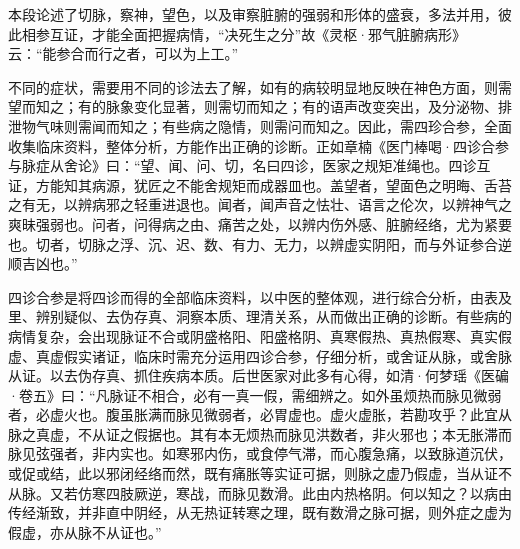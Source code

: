 \documentclass[12pt]{ctexbook}
\begin{document}


本段论述了切脉，察神，望色，以及审察脏腑的强弱和形体的盛衰，多法并用，彼此相参互证，才能全面把握病情，“决死生之分”故《灵枢·邪气脏腑病形》云：“能参合而行之者，可以为上工。”

不同的症状，需要用不同的诊法去了解，如有的病较明显地反映在神色方面，则需望而知之；有的脉象变化显著，则需切而知之；有的语声改变突出，及分泌物、排泄物气味则需闻而知之；有些病之隐情，则需问而知之。因此，需四珍合参，全面收集临床资料，整体分析，方能作出正确的诊断。正如章楠《医门棒喝·四诊合参与脉症从舍论》曰：“望、闻、问、切，名曰四诊，医家之规矩准绳也。四诊互证，方能知其病源，犹匠之不能舍规矩而成器皿也。盖望者，望面色之明晦、舌苔之有无，以辨病邪之轻重进退也。闻者，闻声音之怯壮、语言之伦次，以辨神气之爽昧强弱也。问者，问得病之由、痛苦之处，以辨内伤外感、脏腑经络，尤为紧要也。切者，切脉之浮、沉、迟、数、有力、无力，以辨虚实阴阳，而与外证参合逆顺吉凶也。”



四诊合参是将四诊而得的全部临床资料，以中医的整体观，进行综合分析，由表及里、辨别疑似、去伪存真、洞察本质、理清关系，从而做出正确的诊断。有些病的病情复杂，会出现脉证不合或阴盛格阳、阳盛格阴、真寒假热、真热假寒、真实假虚、真虚假实诸证，临床时需充分运用四诊合参，仔细分析，或舍证从脉，或舍脉从证。以去伪存真、抓住疾病本质。后世医家对此多有心得，如清·何梦瑶《医碥·卷五》曰：“凡脉证不相合，必有一真一假，需细辨之。如外虽烦热而脉见微弱者，必虚火也。腹虽胀满而脉见微弱者，必胃虚也。虚火虚胀，若勘攻乎？此宜从脉之真虚，不从证之假据也。其有本无烦热而脉见洪数者，非火邪也；本无胀滞而脉见弦强者，非内实也。如寒邪内伤，或食停气滞，而心腹急痛，以致脉道沉伏，或促或结，此以邪闭经络而然，既有痛胀等实证可据，则脉之虚乃假虚，当从证不从脉。又若仿寒四肢厥逆，寒战，而脉见数滑。此由内热格阴。何以知之？以病由传经渐致，并非直中阴经，从无热证转寒之理，既有数滑之脉可据，则外症之虚为假虚，亦从脉不从证也。”

\end{document}
